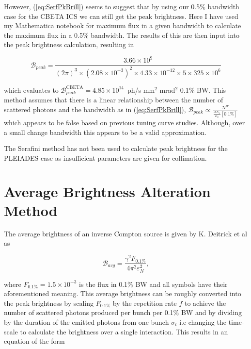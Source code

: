 \documentclass[10pt]{article}
\begin{document}
However, (\ref{eq:SerfPkBrill}) seems to suggest that by using our 0.5\%  bandwidth case for the CBETA ICS we can still get the peak brightness. Here I have used my Mathematica notebook for maximum flux in a given bandwidth to calculate the maximum flux in a 0.5\% bandwidth. The results of this are then input into the peak brightness calculation, resulting in

\begin{equation}
\mathcal{B}_{peak} = \frac{3.66\times 10^{9}}{\left(2\pi\right)^{3}\times \left(2.08\times 10^{-3}\right)^{2}\times 4.33\times 10^{-12}\times 5 \times 325\times 10^{6}}
\label{eq:CBETASerf}
\end{equation}   

which evaluates to $\mathcal{B}^{\mathrm{CBETA}}_{peak} = 4.85\times 10^{14}$~ph/s mm$^{2}$-mrad$^{2}$ 0.1\% BW. This method assumes that there is a linear relationship between the number of scattered photons and the bandwidth as in (\ref{eq:SerfPkBrill}), $\mathcal{B}_{peak} \propto \frac{\mathcal{N}^{\Psi}}{\frac{\Delta E_{x}}{E_{x}}\left[0.1\%\right]}$ which appears to be false based on previous tuning curve studies. Although, over a small change bandwidth this appears to be a valid approximation.

The Serafini method has not been used to calculate peak brightness for the PLEIADES case as insufficient parameters are given for collimation.
  
\section*{Average Brightness Alteration Method}

The average brightness of an inverse Compton source is given by K. Deitrick et al \cite{deitrick2018high} as 

\begin{equation}
\mathcal{B}_{avg} = \frac{\gamma^{2}F_{0.1\%}}{4\pi^{2}\varepsilon_{N}^{2}},
\label{eq:KrafftAvgBrill}
\end{equation}

where $F_{0.1\%} = 1.5\times10^{-3}$ is the flux in 0.1\% BW and all symbols have their aforementioned meaning. This average brightness can be roughly converted into the peak brightness by scaling $F_{0.1\%}$ by the repetition rate $f$ to achieve the number of scattered photons produced per bunch per 0.1\% BW and by dividing by the duration of the emitted photons from one bunch $\sigma_{t}$ i.e changing the time-scale to calculate the brightness over a single interaction. This results in an equation of the form
\end{document}
